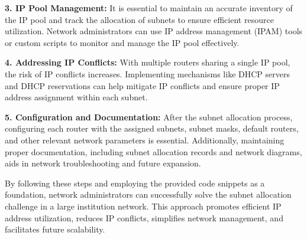 \textbf{3. IP Pool Management:} It is essential to maintain an accurate inventory of the IP pool and track the allocation of subnets to ensure efficient resource utilization. Network administrators can use IP address management (IPAM) tools or custom scripts to monitor and manage the IP pool effectively.

\textbf{4. Addressing IP Conflicts:} With multiple routers sharing a single IP pool, the risk of IP conflicts increases. Implementing mechanisms like DHCP servers and DHCP reservations can help mitigate IP conflicts and ensure proper IP address assignment within each subnet.

\textbf{5. Configuration and Documentation:} After the subnet allocation process, configuring each router with the assigned subnets, subnet masks, default routers, and other relevant network parameters is essential. Additionally, maintaining proper documentation, including subnet allocation records and network diagrams, aids in network troubleshooting and future expansion.

By following these steps and employing the provided code snippets as a foundation, network administrators can successfully solve the subnet allocation challenge in a large institution network. This approach promotes efficient IP address utilization, reduces IP conflicts, simplifies network management, and facilitates future scalability.